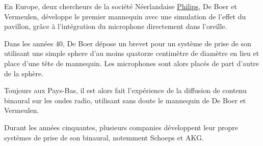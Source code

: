 \documentclass[
  letterpaper,
  DIV=11,
  numbers=noendperiod]{scrreprt}
\begin{document}
En Europe, deux chercheurs de la société Néerlandaise
\href{https://fr.wikipedia.org/wiki/Philips}{Philips}, De Boer et
Vermeulen, développe le premier mannequin avec une simulation de l'effet
du pavillon, grâce à l'intégration du microphone directement dans
l'oreille.

Dans les années 40, De Boer dépose un brevet pour un système de prise de
son utilisant une simple sphere d'au moins quatorze centimètre de
diamètre en lieu et place d'une tête de mannequin. Les microphones sont
alors placés de part d'autre de la sphère.

Toujours aux Pays-Bas, il est alors fait l'expérience de la diffusion de
contenu binaural sur les ondes radio, utilisant sans doute le mannequin
de De Boer et Vermeulen.

Durant les années cinquantes, plusieurs companies développent leur
propre systèmes de prise de son binaural, notemment Schoeps et AKG.
\end{document}
